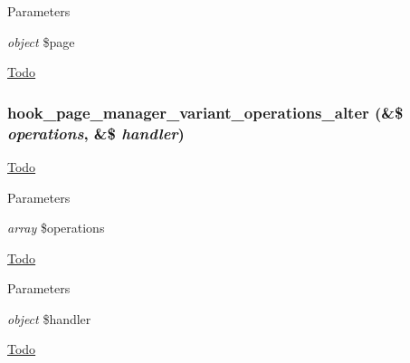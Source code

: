 \begin{DoxyParams}{Parameters}
\item[{\em object}]\$page \end{DoxyParams}
\begin{Desc}
\item[\hyperlink{todo__todo000011}{Todo}]\end{Desc}
\hypertarget{group__hooks_gaf5d4ce054cae22b3bdca52011c6e8fbc}{
\subsubsection[{hook\_\-page\_\-manager\_\-variant\_\-operations\_\-alter}]{\setlength{\rightskip}{0pt plus 5cm}hook\_\-page\_\-manager\_\-variant\_\-operations\_\-alter (\&\$ {\em operations}, \/  \&\$ {\em handler})}}
\label{group__hooks_gaf5d4ce054cae22b3bdca52011c6e8fbc}
\begin{Desc}
\item[\hyperlink{todo__todo000012}{Todo}]\end{Desc}

\begin{DoxyParams}{Parameters}
\item[{\em array}]\$operations \end{DoxyParams}
\begin{Desc}
\item[\hyperlink{todo__todo000013}{Todo}]\end{Desc}

\begin{DoxyParams}{Parameters}
\item[{\em object}]\$handler \end{DoxyParams}
\begin{Desc}
\item[\hyperlink{todo__todo000014}{Todo}]\end{Desc}
